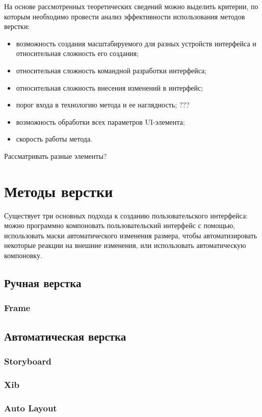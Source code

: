 На основе рассмотренных теоретических сведений можно выделить критерии, по которым необходимо провести анализ эффективности использования методов верстки:

\begin{itemize}
	\item возможность создания масштабируемого для разных устройств интерфейса и относительная сложность его создания;
	\item относительная сложность командной разработки интерфейса;
	\item относительная сложность внесения изменений в интерфейс;
	\item порог входа в технологию метода и ее наглядность; ???
	\item возможность обработки всех параметров UI-элемента;
	\item скорость работы метода.
\end{itemize}

Рассматривать разные элементы?

\chapter{Методы верстки}

Существует три основных подхода к созданию пользовательского интерфейса: можно программно компоновать пользовательский интерфейс с помощью, использовать маски автоматического изменения размера, чтобы автоматизировать некоторые реакции на внешние изменения, или использовать автоматическую компоновку.
\section{Ручная верстка}
\subsection{Frame}

\section{Автоматическая верстка}
\subsection{Storyboard}
\subsection{Xib}
\subsection{Auto Layout}
